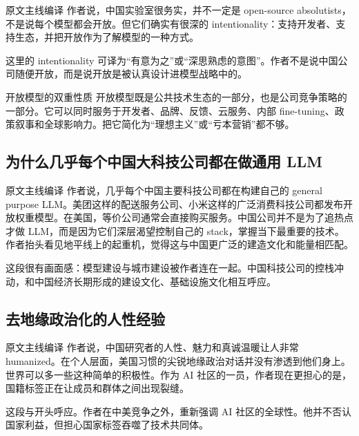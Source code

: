 \documentclass[a4paper]{article}
\begin{document}
\begin{translationbox}{原文主线编译}
作者说，中国实验室很务实，并不一定是 open-source absolutists，不是说每个模型都会开放。但它们确实有很深的 intentionality：支持开发者、支持生态，并把开放作为了解模型的一种方式。
\end{translationbox}

这里的 intentionality 可译为``有意为之''或``深思熟虑的意图''。作者不是说中国公司随便开放，而是说开放是被认真设计进模型战略中的。

\begin{importantbox}{开放模型的双重性质}
开放模型既是公共技术生态的一部分，也是公司竞争策略的一部分。它可以同时服务于开发者、品牌、反馈、云服务、内部 fine-tuning、政策叙事和全球影响力。把它简化为``理想主义''或``亏本营销''都不够。
\end{importantbox}

\subsection{为什么几乎每个中国大科技公司都在做通用 LLM}

\begin{translationbox}{原文主线编译}
作者说，几乎每个中国主要科技公司都在构建自己的 general purpose LLM。美团这样的配送服务公司、小米这样的广泛消费科技公司都发布开放权重模型。在美国，等价公司通常会直接购买服务。中国公司并不是为了追热点才做 LLM，而是因为它们深层渴望控制自己的 stack，掌握当下最重要的技术。作者抬头看见地平线上的起重机，觉得这与中国更广泛的建造文化和能量相匹配。
\end{translationbox}

这段很有画面感：模型建设与城市建设被作者连在一起。中国科技公司的控栈冲动，和中国经济长期形成的建设文化、基础设施文化相互呼应。

\subsection{去地缘政治化的人性经验}

\begin{translationbox}{原文主线编译}
作者说，中国研究者的人性、魅力和真诚温暖让人非常 humanized。在个人层面，美国习惯的尖锐地缘政治对话并没有渗透到他们身上。世界可以多一些这种简单的积极性。作为 AI 社区的一员，作者现在更担心的是，国籍标签正在让成员和群体之间出现裂缝。
\end{translationbox}

这段与开头呼应。作者在中美竞争之外，重新强调 AI 社区的全球性。他并不否认国家利益，但担心国家标签吞噬了技术共同体。
\end{document}
